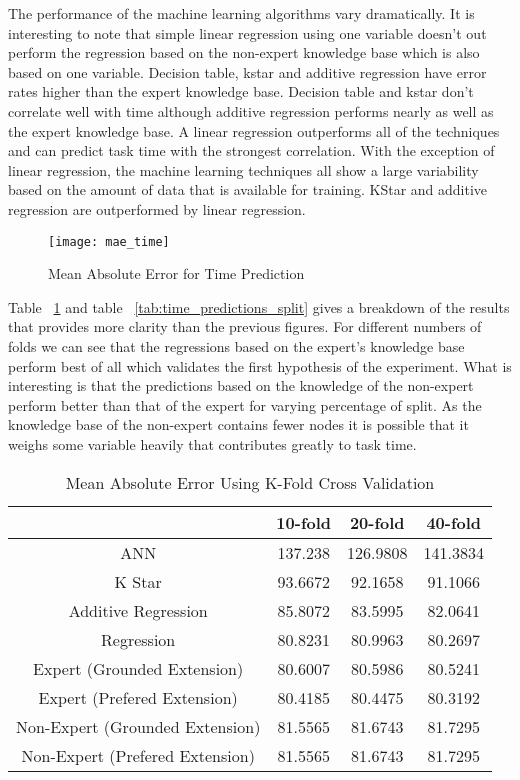 The performance of the machine learning algorithms vary dramatically. It is interesting to note that simple linear regression using one variable doesn't out perform the regression based on the non-expert knowledge base which is also based on one variable. Decision table, kstar and additive regression have error rates higher than the expert knowledge base. Decision table and kstar don't correlate well with time although additive regression performs nearly as well as the expert knowledge base. A linear regression outperforms all of the techniques and can predict task time with the strongest correlation. With the exception of linear regression, the machine learning techniques all show a large variability based on the amount of data that is available for training. KStar and additive regression are outperformed by linear regression. 

\begin{figure}[!h]
\centering
\texttt{[image: mae\_time]}
\caption{Mean Absolute Error for Time Prediction}
\label{fig:mae_time}
\end{figure}

Table ~\ref{tab:time_predictions_fold} and table ~\ref{tab:time_predictions_split} gives a breakdown of the results that provides more clarity than the previous figures. For different numbers of folds we can see that the regressions based on the expert's knowledge base perform best of all which validates the first hypothesis of the experiment. What is interesting is that the predictions based on the knowledge of the non-expert perform better than that of the expert for varying percentage of split. As the knowledge base of the non-expert contains fewer nodes it is possible that it weighs some variable heavily that contributes greatly to task time.

\begin{table}[!htbp]
\centering
\begin{tabular}{|c|c|c|c|}
\hline
                                &  10-fold & 20-fold & 40-fold \\ \hline
ANN                             & 137.238 & 126.9808 & 141.3834 \\
K Star                          & 93.6672 & 92.1658 & 91.1066 \\
Additive Regression             & 85.8072  & 83.5995  & 82.0641 \\
Regression                      & 80.8231 & 80.9963 & 80.2697 \\
Expert (Grounded Extension)     & 80.6007 & 80.5986 & 80.5241 \\
Expert (Prefered Extension)     & 80.4185 & 80.4475 &  80.3192 \\
Non-Expert (Grounded Extension) & 81.5565 & 81.6743 & 81.7295 \\
Non-Expert (Prefered Extension) & 81.5565 & 81.6743 & 81.7295 \\
\hline
\end{tabular}
\caption{Mean Absolute Error Using K-Fold Cross Validation}
\label{tab:time_predictions_fold}
\end{table}

